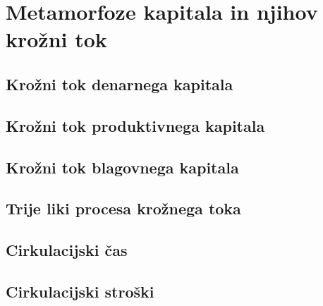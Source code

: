 \documentclass[egregdoesnotlikesansseriftitles, a5paper, BCOR=1cm, DIV=calc]{scrbook}
\begin{document}
% 

\part{Metamorfoze kapitala in njihov krožni tok}

    \chapter{Krožni tok denarnega kapitala}
    

    \chapter{Krožni tok produktivnega kapitala}
    

    \chapter{Krožni tok blagovnega kapitala}

    \chapter{Trije liki procesa krožnega toka}

    \chapter{Cirkulacijski čas}
    
    
    \chapter{Cirkulacijski stroški}
    



\end{document}
